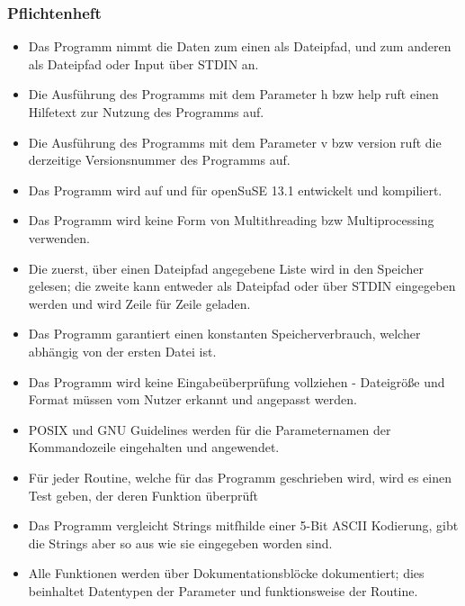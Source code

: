 \subsubsection{Pflichtenheft}
\label{auszug:pflichtenheft}
\begin{itemize}

    \item Das Programm nimmt die Daten zum einen als Dateipfad, und zum anderen als Dateipfad oder Input über STDIN an.

    \item Die Ausführung des Programms mit dem Parameter \-h bzw \-\-help ruft einen Hilfetext zur Nutzung des Programms auf.

    \item Die Ausführung des Programms mit dem Parameter \-v bzw \-\-version ruft die derzeitige Versionsnummer des Programms auf.

    \item Das Programm wird auf und für openSuSE 13.1 entwickelt und kompiliert.

    \item Das Programm wird keine Form von Multithreading bzw Multiprocessing verwenden.

    \item Die zuerst, über einen Dateipfad angegebene Liste wird in den Speicher gelesen;
    die zweite kann entweder als Dateipfad oder über STDIN eingegeben werden und wird Zeile für Zeile geladen.

    \item Das Programm garantiert einen konstanten Speicherverbrauch, welcher abhängig von der ersten Datei ist.

    \item Das Programm wird keine Eingabeüberprüfung vollziehen - Dateigröße und Format müssen vom Nutzer erkannt und angepasst werden.

    \item POSIX und GNU Guidelines werden für die Parameternamen der Kommandozeile eingehalten und angewendet.

    \item Für jeder Routine, welche für das Programm geschrieben wird, wird es einen Test geben, der deren Funktion überprüft

    \item Das Programm vergleicht Strings mitfhilde einer 5-Bit ASCII Kodierung, gibt die Strings aber so aus wie sie eingegeben worden sind.

    \item Alle Funktionen werden über Dokumentationsblöcke dokumentiert; dies beinhaltet Datentypen der Parameter und funktionsweise der Routine.

\end{itemize}

